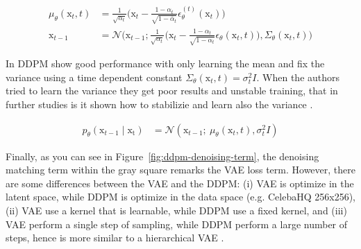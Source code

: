 \begin{align}\label{eqn:backward-noise-reparameterization}
    \mu_{\theta}(\mathrm{x}_{t}, t) &= \frac{1}{\sqrt{\alpha_{t}}}\big(\mathrm{x}_{t} - \frac{1-\alpha_{t}}{\sqrt{1-\bar{\alpha}_{t}}}\epsilon_{\theta}^{(t)}(\mathrm{x}_{t})\big) \\
    \mathrm{x}_{t-1} &= \mathcal{N}\big(\mathrm{x}_{t-1}; \frac{1}{\sqrt{\alpha_{t}}}\big(\mathrm{x}_{t} - \frac{1-\alpha_{t}}{\sqrt{1-\bar{\alpha}_{t}}}\epsilon_{\theta}(\mathrm{x}_{t}, t)\big), \Sigma_{\theta}(\mathrm{x}_{t}, t)\big)
\end{align}


\noindent In DDPM show good performance with only learning the mean
and fix the variance using a time dependent constant $\Sigma_{\theta}(\mathrm{x}_{t}, t) = \sigma_{t}^{2}I$. When the authors tried to learn the variance they get poor results and unstable training, that in further studies is it shown how to stabilizie and learn also the variance \citep{nichol2021improved}.

\begin{align}\label{eqn:backward-process-fix-variance}
    p_{\theta}(\mathrm{x}_{t-1}\mid\mathrm{x_{t}}) &= \mathcal{N}(\mathrm{x}_{t-1};~\mu_{\theta}(\mathrm{x}_{t}, t), \sigma_{t}^{2}I)
\end{align}


\noindent Finally, as you can see in Figure~\ref{fig:ddpm-denoising-term}, the denoising matching term within the gray square remarks the VAE loss term. However, there are some differences between the VAE and the DDPM: (i) VAE is optimize in the latent space, while DDPM is optimize in the data space (e.g. CelebaHQ 256x256), (ii) VAE use a kernel that is learnable, while DDPM use a fixed kernel, and (iii) VAE perform a single step of sampling, while DDPM perform a large number of steps, hence is more similar to a hierarchical VAE \citep{luo2022understanding}.\\


